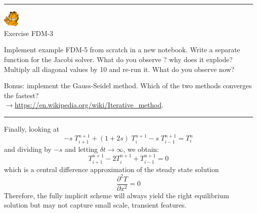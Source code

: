 \begin{center}
\begin{minipage}[t]{0.77\textwidth}
\par\noindent\rule{\textwidth}{0.4pt}

\begin{center}
\includegraphics[width=0.8cm]{images/garftr} \\
{\color{orange}Exercise FDM-3}
\end{center}

Implement example FDM-5 from scratch in a new notebook.
Write a separate function for the Jacobi solver.
What do you observe ? why does it explode? 
Multiply all diagonal values by 10 and re-run it. 
What do you observe now? 

Bonus: implement the Gauss-Seidel method.
Which of the two methods converges the fastest?\\
$\rightarrow$\url{https://en.wikipedia.org/wiki/Iterative_method}. 
\par\noindent\rule{\textwidth}{0.4pt}
\end{minipage}
\end{center}


\noindent
Finally, looking at
\begin{equation}
-s\;  T_{i+1}^{n+1} + (1+2s)\;  T_{i}^{n+1} - s\;  T_{i-1}^{n+1} = T_i^{n}
\end{equation}
and dividing by $-s$ and letting $\delta t \rightarrow \infty$, we obtain:
\begin{equation}
T_{i+1}^{n+1} -2 T_{i}^{n+1} + T_{i-1}^{n+1} = 0
\end{equation}
which is a central difference approximation of the steady state solution
\begin{equation}
\frac{\partial^2 T }{\partial x^2}=0
\end{equation}
Therefore, the fully implicit scheme will always yield the right equilibrium solution 
but may not capture small scale, transient features.


